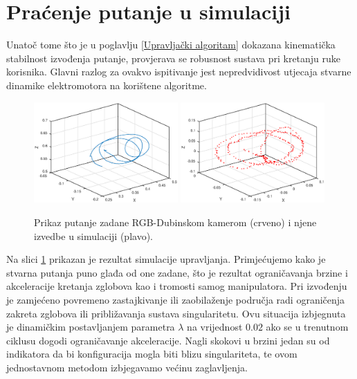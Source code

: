\documentclass[times, utf8, diplomski, numeric]{fer}
\begin{document}
\section{Praćenje putanje u simulaciji}
Unatoč tome što je u poglavlju \ref{Upravljački algoritam} dokazana kinematička stabilnost izvođenja putanje, provjerava se robusnost sustava pri kretanju ruke korisnika.
Glavni razlog za ovakvo ispitivanje jest nepredvidivost utjecaja stvarne dinamike elektromotora na korištene algoritme.
\begin{figure}[H]
\centering
\includegraphics[width=0.49\textwidth]{kinect_gazebo_stvarni2}
\includegraphics[width=0.49\textwidth]{kinect_gazebo_zadani2}
\caption{Prikaz putanje zadane RGB-Dubinskom kamerom (crveno) i njene izvedbe u simulaciji (plavo).}
\label{fig:kinectsim}
\end{figure}

Na slici \ref{fig:kinectsim} prikazan je rezultat simulacije upravljanja.
Primjećujemo kako je stvarna putanja puno glađa od one zadane, što je rezultat ograničavanja brzine i akceleracije kretanja zglobova kao i tromosti samog manipulatora.
Pri izvođenju je zamjećeno povremeno zastajkivanje ili zaobilaženje područja radi ograničenja zakreta zglobova ili približavanja sustava singularitetu.
Ovu situacija izbjegnuta je dinamičkim postavljanjem parametra $\lambda$ na vrijednost $0.02$ ako se u trenutnom ciklusu dogodi ograničavanje akceleracije.
Nagli skokovi u brzini jedan su od indikatora da bi konfiguracija mogla biti blizu singulariteta, te ovom jednostavnom metodom izbjegavamo većinu zaglavljenja.
\end{document}
